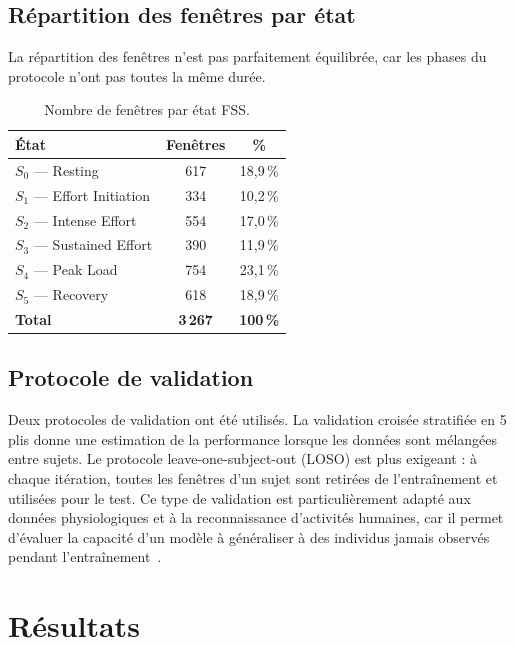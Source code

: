 \documentclass[12pt,a4paper]{article}
\begin{document}
\subsection{Répartition des fenêtres par état}

La répartition des fenêtres n'est pas parfaitement équilibrée, car les
phases du protocole n'ont pas toutes la même durée.

\begin{table}[H]
\centering
\caption{Nombre de fenêtres par état FSS.}
\label{tab:windows}
\begin{tabular}{lcc}
\toprule
\textbf{État} & \textbf{Fenêtres} & \textbf{\%} \\
\midrule
$S_0$ — Resting           & 617  & 18,9\,\% \\
$S_1$ — Effort Initiation & 334  & 10,2\,\% \\
$S_2$ — Intense Effort    & 554  & 17,0\,\% \\
$S_3$ — Sustained Effort  & 390  & 11,9\,\% \\
$S_4$ — Peak Load         & 754  & 23,1\,\% \\
$S_5$ — Recovery          & 618  & 18,9\,\% \\
\midrule
\textbf{Total}            & \textbf{3\,267} & \textbf{100\,\%} \\
\bottomrule
\end{tabular}
\end{table}

\subsection{Protocole de validation}

Deux protocoles de validation ont été utilisés. La validation croisée
stratifiée en 5 plis donne une estimation de la performance lorsque les
données sont mélangées entre sujets. Le protocole leave-one-subject-out
(LOSO) est plus exigeant : à chaque itération, toutes les fenêtres d'un
sujet sont retirées de l'entraînement et utilisées pour le test. Ce type de
validation est particulièrement adapté aux données physiologiques et à la
reconnaissance d'activités humaines, car il permet d'évaluer la capacité
d'un modèle à généraliser à des individus jamais observés pendant
l'entraînement~\cite{loso_cv}.


\section{Résultats}
\label{sec:resultats}
\end{document}
